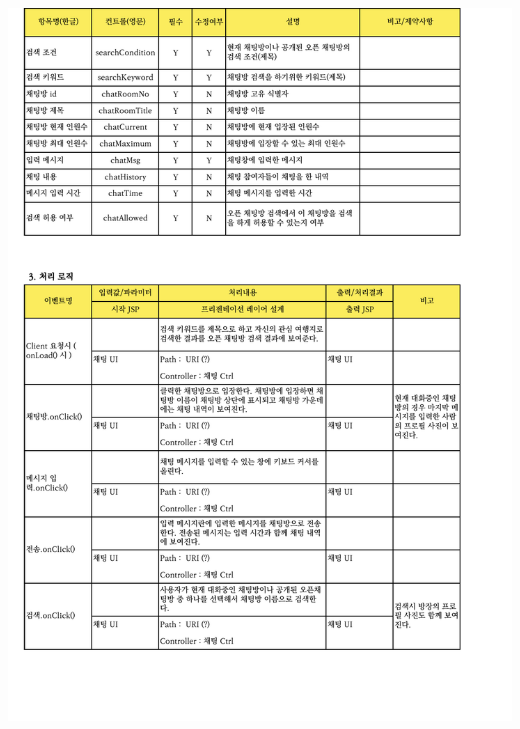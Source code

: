 {{{{{{{{{{{{{{{{{{{{{{{{{{{{{{{{{{{{{{{{{{{{{{{{{{{{{{{{{{{{{{{\includegraphics[width=20cm]{./Figure/Analysis/Display/chat/chat_02.pdf} \\
}}}}}}}}}}}}}}}}}}}}}}}}}}}}}}}}}}}}}}}}}}}}}}}}}}}}}}}}}}}}}}}
